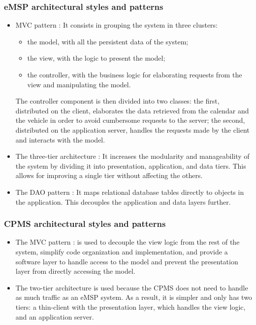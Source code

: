 \subsubsection{\ac{eMSP} architectural styles and patterns}
\begin{itemize}
    \item \acl{MVC} pattern \cite{ref:MVC-pattern}: It consists in grouping the system in three clusters:
          \begin{itemize}
              \item the model, with all the persistent data of the system;
              \item the view, with the logic to present the model;
              \item the controller, with the business logic for elaborating requests from the view and manipulating the model.
          \end{itemize}
          The controller component is then divided into two classes:
          the first, distributed on the client, elaborates the data retrieved from the calendar and the vehicle in order to avoid cumbersome requests to the server;
          the second, distributed on the application server, handles the requests made by the client and interacts with the model.
    \item The three-tier architecture \cite{ref:multitier-pattern}: It increases the modularity and manageability of the system by dividing it into presentation, application, and data tiers. This allows for improving a single tier without affecting the others.
    \item The \ac{DAO} pattern \cite{ref:dao-pattern}: It maps relational database tables directly to objects in the application. This decouples the application and data layers further.
\end{itemize}

\subsubsection{\ac{CPMS} architectural styles and patterns}
\begin{itemize}
    \item The \acl{MVC} pattern \cite{ref:MVC-pattern}: is used to decouple the view logic from the rest of the system, simplify code organization and implementation, and provide a software layer to handle access to the model and prevent the presentation layer from directly accessing the model.
    \item The two-tier architecture \cite{ref:multitier-pattern} is used because the \ac{CPMS} does not need to handle as much traffic as an \ac{eMSP} system. As a result, it is simpler and only has two tiers: a thin-client with the presentation layer, which handles the view logic, and an application server.
\end{itemize}


